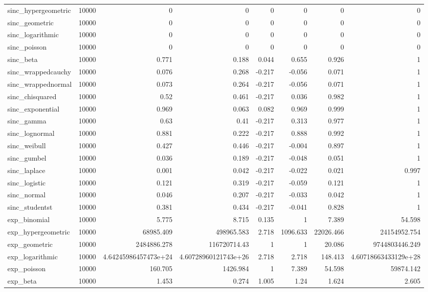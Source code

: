 \begin{table}[!htbp]
{\begin{tabular}{lrrrrrrr}
sinc\_hypergeometric & 10000 & 0 & 0 & 0 & 0 & 0 & 0 \\ 
sinc\_geometric & 10000 & 0 & 0 & 0 & 0 & 0 & 0 \\ 
sinc\_logarithmic & 10000 & 0 & 0 & 0 & 0 & 0 & 0 \\ 
sinc\_poisson & 10000 & 0 & 0 & 0 & 0 & 0 & 0 \\ 
sinc\_beta & 10000 & 0.771 & 0.188 & 0.044 & 0.655 & 0.926 & 1 \\ 
sinc\_wrappedcauchy & 10000 & 0.076 & 0.268 & -0.217 & -0.056 & 0.071 & 1 \\ 
sinc\_wrappednormal & 10000 & 0.073 & 0.264 & -0.217 & -0.056 & 0.071 & 1 \\ 
sinc\_chisquared & 10000 & 0.52 & 0.461 & -0.217 & 0.036 & 0.982 & 1 \\ 
sinc\_exponential & 10000 & 0.969 & 0.063 & 0.082 & 0.969 & 0.999 & 1 \\ 
sinc\_gamma & 10000 & 0.63 & 0.41 & -0.217 & 0.313 & 0.977 & 1 \\ 
sinc\_lognormal & 10000 & 0.881 & 0.222 & -0.217 & 0.888 & 0.992 & 1 \\ 
sinc\_weibull & 10000 & 0.427 & 0.446 & -0.217 & -0.004 & 0.897 & 1 \\ 
sinc\_gumbel & 10000 & 0.036 & 0.189 & -0.217 & -0.048 & 0.051 & 1 \\ 
sinc\_laplace & 10000 & 0.001 & 0.042 & -0.217 & -0.022 & 0.021 & 0.997 \\ 
sinc\_logistic & 10000 & 0.121 & 0.319 & -0.217 & -0.059 & 0.121 & 1 \\ 
sinc\_normal & 10000 & 0.046 & 0.207 & -0.217 & -0.033 & 0.042 & 1 \\ 
sinc\_studentst & 10000 & 0.381 & 0.434 & -0.217 & -0.041 & 0.828 & 1 \\ 
exp\_binomial & 10000 & 5.775 & 8.715 & 0.135 & 1 & 7.389 & 54.598 \\ 
exp\_hypergeometric & 10000 & 68985.409 & 498965.583 & 2.718 & 1096.633 & 22026.466 & 24154952.754 \\ 
exp\_geometric & 10000 & 2484886.278 & 116720714.43 & 1 & 1 & 20.086 & 9744803446.249 \\ 
exp\_logarithmic & 10000 & 4.64245986457473e+24 & 4.60728960121743e+26 & 2.718 & 2.718 & 148.413 & 4.60718663433129e+28 \\ 
exp\_poisson & 10000 & 160.705 & 1426.984 & 1 & 7.389 & 54.598 & 59874.142 \\ 
exp\_beta & 10000 & 1.453 & 0.274 & 1.005 & 1.24 & 1.624 & 2.605 \\ 

\end{tabular}}
\end{table}
